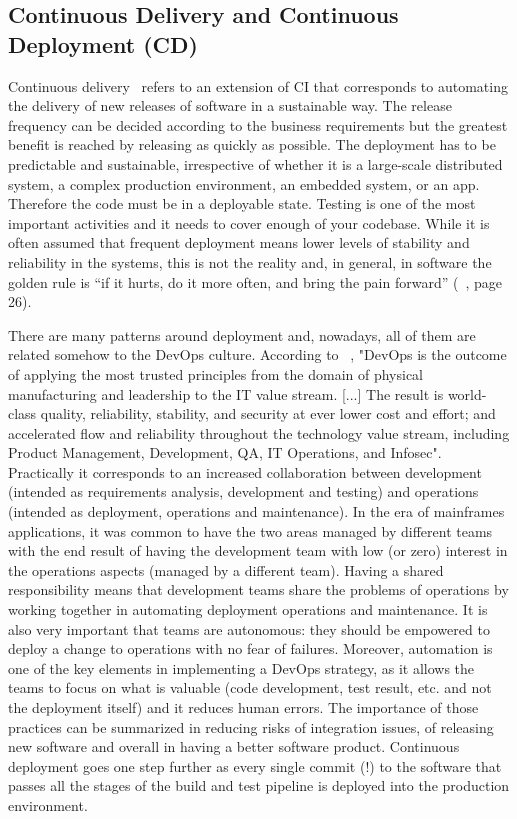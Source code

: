 \documentclass[a4paper]{spie}  %
\begin{document}
\subsection{Continuous Delivery and Continuous Deployment (CD)}
Continuous delivery~\cite{CD} refers to an extension of CI that corresponds to automating the delivery of new releases of software in a sustainable way. The release frequency can be decided according to the business requirements but the greatest benefit is reached by releasing as quickly as possible.
The deployment has to be predictable and sustainable, irrespective of whether it is a large-scale distributed system, a complex production environment, an embedded system, or an app. Therefore the code must be in a deployable state. Testing is one of the most important activities and it needs to cover enough of your codebase.
While it is often assumed that frequent deployment means lower levels of stability and reliability in the systems, this is not the reality and, in general, in software the golden rule is “if it hurts, do it more often, and bring the pain forward” (~\cite{CD}, page 26).

There are many patterns around deployment and, nowadays, all of them are related somehow to the DevOps culture. According to ~\cite{DevOps}, "DevOps is the outcome of applying the most trusted principles from the domain of physical manufacturing and leadership to the IT value stream. [...] The result is world-class quality, reliability, stability, and security at ever lower cost and effort; and accelerated flow and reliability throughout the technology value stream, including Product Management, Development, QA, IT Operations, and Infosec". Practically it corresponds to an increased collaboration between development (intended as requirements analysis, development and testing) and operations (intended as deployment, operations and maintenance). In the era of mainframes applications, it was common to have the two areas managed by different teams with the end result of having the development team with low (or zero) interest in the operations aspects (managed by a different team). Having a shared responsibility means that development teams share the problems of operations by working together in automating deployment operations and maintenance. It is also very important that teams are autonomous: they should be empowered to deploy a change to operations with no fear of failures.
Moreover, automation is one of the key elements in implementing a DevOps strategy, as it allows the teams to focus on what is valuable (code development, test result, etc. and not the deployment itself) and it reduces human errors.
The importance of those practices can be summarized in reducing risks of integration issues, of releasing new software and overall in having a better software product.
Continuous deployment goes one step further as every single commit (!) to the software that passes all the stages of the build and test pipeline is deployed into the production environment.
\end{document}
